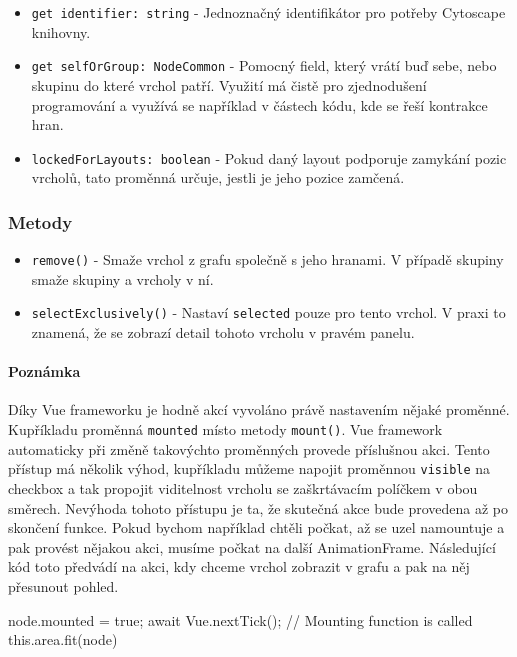\begin{itemize}
  \item \texttt{get identifier: string} - Jednoznačný identifikátor pro potřeby Cytoscape knihovny.

  \item \texttt{get selfOrGroup: NodeCommon} - Pomocný field, který vrátí buď sebe, nebo skupinu do které vrchol patří. Využití má čistě pro zjednodušení programování a využívá se například v částech kódu, kde se řeší kontrakce hran.

  \item \texttt{lockedForLayouts: boolean} - Pokud daný layout podporuje zamykání pozic vrcholů, tato proměnná určuje, jestli je jeho pozice zamčená.
\end{itemize}

\subsubsection*{Metody}
\begin{itemize}
  \item \texttt{remove()} - Smaže vrchol z grafu společně s jeho hranami. V případě skupiny smaže skupiny a vrcholy v ní.
  \item \texttt{selectExclusively()} - Nastaví \texttt{selected} pouze pro tento vrchol. V praxi to znamená, že se zobrazí detail tohoto vrcholu v pravém panelu.
\end{itemize}

\paragraph{Poznámka} Díky Vue frameworku je hodně akcí vyvoláno právě nastavením nějaké proměnné. Kupříkladu proměnná \texttt{mounted} místo metody \texttt{mount()}. Vue framework automaticky při změně takovýchto proměnných provede příslušnou akci. Tento přístup má několik výhod, kupříkladu můžeme napojit proměnnou \texttt{visible} na checkbox a tak propojit viditelnost vrcholu se zaškrtávacím políčkem v obou směrech. Nevýhoda tohoto přístupu je ta, že skutečná akce bude provedena až po skončení funkce. Pokud bychom například chtěli počkat, až se uzel namountuje a pak provést nějakou akci, musíme počkat na další AnimationFrame. Následující kód toto předvádí na akci, kdy chceme vrchol zobrazit v grafu a pak na něj přesunout pohled.

\begin{code}
node.mounted = true;
await Vue.nextTick(); // Mounting function is called
this.area.fit(node)
\end{code}

